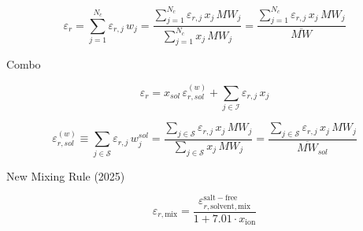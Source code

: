 \documentclass[12pt, letterpaper]{article}
\begin{document}
\begin{equation}
    \varepsilon_{r}=\sum_{j=1}^{N_{c}}\varepsilon_{r,j}\,w_{j}
    =
    \frac{\sum_{j=1}^{N_{c}}\varepsilon_{r,j}\,x_{j}\,MW_{j}}{\sum_{j=1}^{N_{c}}x_{j}\,MW_{j}}
    =
    \frac{\sum_{j=1}^{N_{c}}\varepsilon_{r,j}\,x_{j}\,MW_{j}}{\overline{MW}}
    \label{eq:epsr_mix_mass}
\end{equation}

Combo

\begin{equation}
    \varepsilon_{r} = x_{sol}\,\varepsilon_{r,sol}^{(w)} + \sum_{j\in\mathcal I}\varepsilon_{r,j}\,x_{j}
    \label{eq:epsr_mix_combo}
\end{equation}


\begin{equation}
    \varepsilon_{r,sol}^{(w)} \equiv \sum_{j\in\mathcal S}\varepsilon_{r,j}\,w_{j}^{sol} = \frac{\sum_{j\in\mathcal S}\varepsilon_{r,j}\,x_{j}\,MW_{j}}{\sum_{j\in\mathcal S}x_{j}\,MW_{j}} = \frac{\sum_{j\in\mathcal S}\varepsilon_{r,j}\,x_{j}\,MW_{j}}{\overline{MW}_{sol}}
    \label{eq:epsr_solvent_mass}
\end{equation}

New Mixing Rule (2025)~\cite{Figiel2025}


\begin{equation}
    \varepsilon_{r,\mathrm{mix}}=\frac{\varepsilon_{r,\mathrm{solvent,mix}}^{\mathrm{salt-free}}}{1+7.01\cdot x_{\mathrm{ion}}}
    \label{eq:epsr_mix_figiel2025}
\end{equation}
\end{document}
